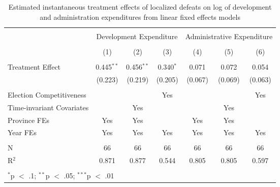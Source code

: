 
\begin{table}[!htbp] \centering 
  \caption{Estimated instantaneous treatment effects of localized defeats on log of development and administration expenditures from linear fixed effects models} 
  \label{tab:lfe_mech} 
\begin{tabular}{@{\extracolsep{5pt}}lcccccc} 
\\[-1.8ex]\hline 
\hline \\[-1.8ex] 
 & \multicolumn{3}{c}{Development Expenditure} & \multicolumn{3}{c}{Administrative Expenditure} \\ 
\\[-1.8ex] & (1) & (2) & (3) & (4) & (5) & (6)\\ 
\hline \\[-1.8ex] 
 Treatment Effect & 0.445$^{**}$ & 0.456$^{**}$ & 0.340$^{*}$ & 0.071 & 0.072 & 0.054 \\ 
  & (0.223) & (0.219) & (0.205) & (0.067) & (0.069) & (0.063) \\ 
 \hline \\[-1.8ex] 
Election Competitiveness &  &  & Yes &  &  & Yes \\ 
Time-invariant Covariates &  & Yes &  &  & Yes &  \\ 
Province FEs & Yes & Yes &  & Yes & Yes &  \\ 
Year FEs & Yes & Yes & Yes & Yes & Yes & Yes \\ 
\hline \\[-1.8ex] 
N & 66 & 66 & 66 & 66 & 66 & 66 \\ 
R$^{2}$ & 0.871 & 0.877 & 0.544 & 0.805 & 0.805 & 0.597 \\ 
\hline 
\hline \\[-1.8ex] 
\multicolumn{7}{l}{$^{*}$p $<$ .1; $^{**}$p $<$ .05; $^{***}$p $<$ .01} \\ 
\end{tabular} 
\end{table} 
